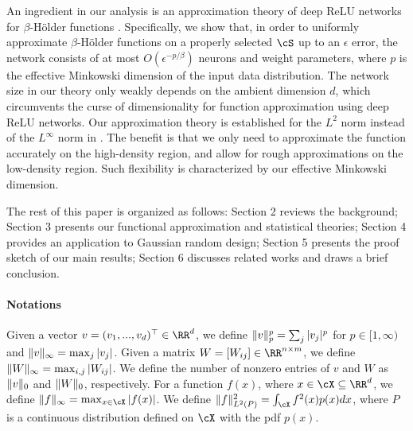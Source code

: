 An ingredient in our analysis is an approximation theory of deep ReLU networks for $\beta$-Hölder functions \citep{YAROTSKY2017103,nakada2020adaptive,chen2019efficient}. Specifically, we show that, in order to uniformly approximate $\beta$-Hölder functions on a properly selected $\cS$ up to an $\epsilon$ error, %
the network consists of at most $O(\epsilon^{-p/\beta})$ neurons and weight parameters, where $p$ is the effective Minkowski dimension of the input data distribution. The network size in our theory only weakly depends on the ambient dimension $d$, which circumvents the curse of dimensionality for function approximation using deep ReLU networks. Our approximation theory is established for the $L^2$ norm instead of the  $L^\infty$ norm in \citet{nakada2020adaptive,chen2019efficient}. The benefit is that we only need to approximate the function accurately on the high-density region, and allow for rough approximations on the low-density region. Such flexibility is characterized by our effective Minkowski dimension.



The rest of this paper is organized as follows: Section 2 reviews the background; Section 3 presents our functional approximation and statistical theories; Section 4 provides an application to Gaussian random design; Section 5 presents the proof sketch of our main results; Section 6 discusses related works and draws a brief conclusion.

\paragraph{Notations} Given a vector $v=(v_1,...,v_d)^\top\in\RR^d$, we define $\|v\|_p^p=\sum_{j}|v_j|^p$ for $p\in[1,\infty)$ and $\|v\|_{\infty}=\max_j|v_j|$. Given a matrix $W=[W_{ij}]\in\RR^{n\times m}$, we define $\|W\|_{\infty}=\max_{i,j}|W_{ij}|$. We define the number of nonzero entries of $v$ and $W$ as $\|v\|_0$ and $\|W\|_0$, respectively. For a function $f(x)$, where $x\in\cX\subseteq \RR^d$, we define $\norm{f}_{\infty} = \max_{x\in\cX}|f(x)|$. We define $\norm{f}^2_{L^2(P)}=\int_{\cX}f^2(x)p(x)dx$, where $P$ is a continuous distribution defined on $\cX$ with the pdf $p(x)$.


